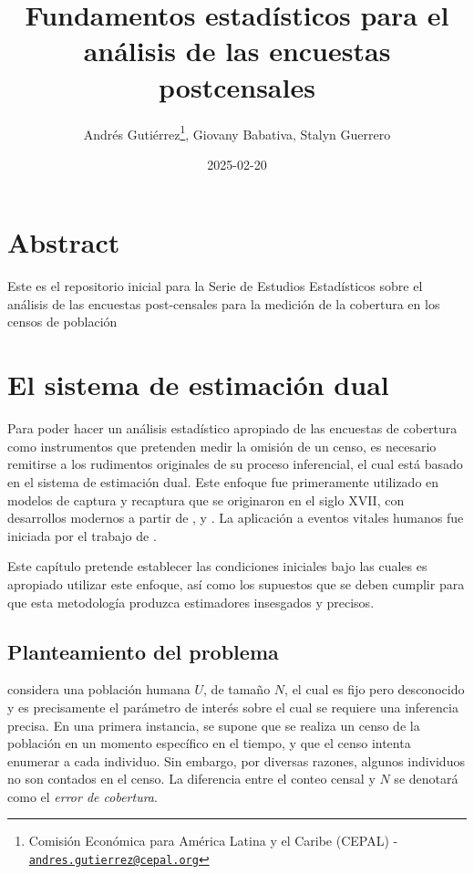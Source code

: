 \documentclass[
  12pt,
]{book}
\title{Fundamentos estadísticos para el análisis de las encuestas postcensales}
\author{Andrés Gutiérrez\footnote{Comisión Económica para América Latina y el Caribe (CEPAL) - \href{mailto:andres.gutierrez@cepal.org}{\nolinkurl{andres.gutierrez@cepal.org}}}, Giovany Babativa, Stalyn Guerrero}
\date{2025-02-20}
\begin{document}
\maketitle

{
\hypersetup{linkcolor=}
\setcounter{tocdepth}{0}
\tableofcontents
}
\listoffigures
\listoftables
\hypertarget{abstract}{%
\chapter*{Abstract}\label{abstract}}

Este es el repositorio inicial para la Serie de Estudios Estadísticos sobre el análisis de las encuestas post-censales para la medición de la cobertura en los censos de población

\hypertarget{el-sistema-de-estimaciuxf3n-dual}{%
\chapter{El sistema de estimación dual}\label{el-sistema-de-estimaciuxf3n-dual}}

Para poder hacer un análisis estadístico apropiado de las encuestas de cobertura como instrumentos que pretenden medir la omisión de un censo, es necesario remitirse a los rudimentos originales de su proceso inferencial, el cual está basado en el sistema de estimación dual. Este enfoque fue primeramente utilizado en modelos de captura y recaptura que se originaron en el siglo XVII, con desarrollos modernos a partir de \citet{petersen1896}, \citet{lincoln1930} y \citet{schnabel1938}. La aplicación a eventos vitales humanos fue iniciada por el trabajo de \citet{sekar1949}.

Este capítulo pretende establecer las condiciones iniciales bajo las cuales es apropiado utilizar este enfoque, así como los supuestos que se deben cumplir para que esta metodología produzca estimadores insesgados y precisos.

\hypertarget{planteamiento-del-problema}{%
\section{Planteamiento del problema}\label{planteamiento-del-problema}}

\citet{wolter1986coverage} considera una población humana \(U\), de tamaño \(N\), el cual es fijo pero desconocido y es precisamente el parámetro de interés sobre el cual se requiere una inferencia precisa. En una primera instancia, se supone que se realiza un censo de la población en un momento específico en el tiempo, y que el censo intenta enumerar a cada individuo. Sin embargo, por diversas razones, algunos individuos no son contados en el censo. La diferencia entre el conteo censal y \(N\) se denotará como el \emph{error de cobertura}.
\end{document}
